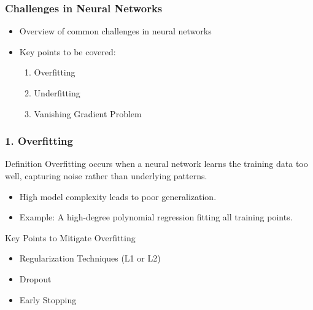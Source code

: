 \documentclass[aspectratio=169]{beamer}
\begin{document}
\begin{frame}[fragile]
    \frametitle{Challenges in Neural Networks}
    
    \begin{itemize}
        \item Overview of common challenges in neural networks
        \item Key points to be covered:
        \begin{enumerate}
            \item Overfitting
            \item Underfitting
            \item Vanishing Gradient Problem
        \end{enumerate}
    \end{itemize}
\end{frame}

\begin{frame}[fragile]
    \frametitle{1. Overfitting}
    
    \begin{block}{Definition}
        Overfitting occurs when a neural network learns the training data too well, capturing noise rather than underlying patterns. 
    \end{block}
    
    \begin{itemize}
        \item High model complexity leads to poor generalization.
        \item Example: A high-degree polynomial regression fitting all training points.
    \end{itemize}
    
    \begin{block}{Key Points to Mitigate Overfitting}
        \begin{itemize}
            \item Regularization Techniques (L1 or L2)
            \item Dropout
            \item Early Stopping
        \end{itemize}
    \end{block}
\end{frame}
\end{document}
